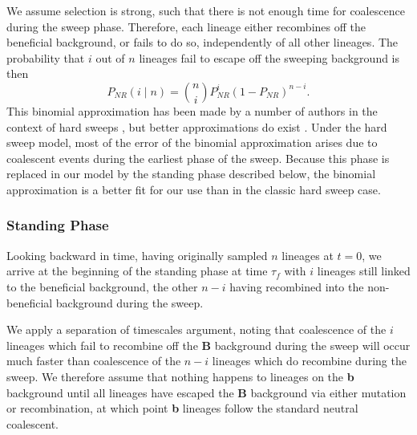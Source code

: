 \documentclass[a4paper,10pt]{article}
\begin{document}
We assume selection is strong, such that there is not enough time for coalescence during the sweep phase. Therefore, each lineage either recombines off the beneficial background, or fails to do so, independently of all other lineages. The probability that $i$ out of $n$ lineages fail to escape off the sweeping background is then
\begin{equation}
P_{NR}(i \mid n) = {n \choose i} P_{NR}^{i} (1-P_{NR})^{n-i}.
\end{equation}
This binomial approximation has been made by a number of authors in the context of hard sweeps \citep[e.g. ][]{Smith1974,Fay:2000us,McVean:2006ke}, but better approximations do exist \citep{Barton1998,Durrett:2004fl,Durrett:2005fr,Schweinsberg:2005eh,Etheridge:2006fk,Messer:2012ie}. Under the hard sweep model, most of the error of the binomial approximation arises due to coalescent events during the earliest phase of the sweep. Because this phase is replaced in our model by the standing phase described below, the binomial approximation is a better fit for our use than in the classic hard sweep case. 


\subsubsection*{Standing Phase}
Looking backward in time, having originally sampled $n$ lineages at $t=0$, we arrive at the beginning of the standing phase at time $\tau_{f}$ with $i$ lineages still linked to the beneficial background, the other $n-i$ having recombined into the non-beneficial background during the sweep.

We apply a separation of timescales argument, noting that coalescence of the $i$ lineages which fail to recombine off the \textbf{B} background during the sweep will occur much faster than coalescence of the $n-i$ lineages which do recombine during the sweep. We therefore assume that nothing happens to lineages on the \textbf{b} background until all lineages have escaped the \textbf{B} background via either mutation or recombination, at which point \textbf{b} lineages follow the standard neutral coalescent.

%
\end{document}
